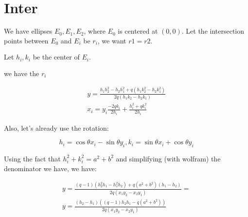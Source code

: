 \documentclass{article}
\begin{document}
		
	\section{Inter}
	We have ellipses $E_0, E_1, E_2$, where $E_0$ is centered at $(0,0)$. Let the intersection points between $E_0$ and $E_i$ be $r_i$, we want $r1=r2$.
	
	Let $h_i,k_i$ be the center of $E_i$.
	
	we have the $r_i$
	
	\begin{align}
	y = \frac{h_1h_2^2 - h_2h_1^2 + q(h_1k_2^2 - h_2k_1^2)}{2q(h_1k_2-h_2k_1)}\\
	x_i = y_i \frac{-2qk_i}{2h_i} + \frac{h_i^2+qk_i^2}{2h_i}
	\end{align}
	
	Also, let's already use the rotation:
	
	\begin{equation}
	h_i=\cos{\theta}x_i - \sin{\theta}y_i, k_i=\sin{\theta}x_i + \cos{\theta}y_i
	\end{equation}
	
	Using the fact that $h_i^2 + k_i^2 = a^2 + b^2$ and simplifying (with wolfram) the denominator we have, we have:
	
	\begin{align*}
	y = \frac{(q-1)(h_2^2h_1 - h_1^2h_2) + q(a^2+b^2)(h_1-h_2)}{2q(x_1y_2-x_2y_1)}=\\
	y = \frac{(h_2-h_1)((q-1)h_2h_1 -q(a^2+b^2))}{2q(x_1y_2-x_2y_1)}
	\end{align*}
\end{document}
